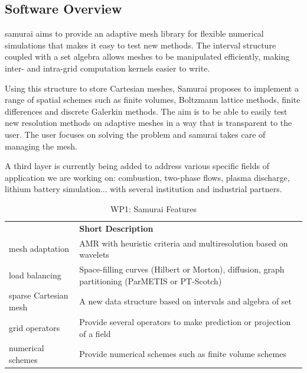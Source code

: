 \subsection{Software Overview}
\label{sec:WP1:Samurai:summary}

samurai aims to provide an adaptive mesh library for flexible numerical simulations that makes it easy to test new methods. The interval structure coupled with a set algebra allows meshes to be manipulated efficiently, making inter- and intra-grid computation kernels easier to write.

Using this structure to store Cartesian meshes, Samurai proposes to implement a range of spatial schemes such as finite volumes, Boltzmann lattice methods, finite differences and discrete Galerkin methods. The aim is to be able to easily test new resolution methods on adaptive meshes in a way that is transparent to the user. The user focuses on solving the problem and samurai takes care of managing the mesh.

A third layer is currently being added to address various specific fields of application we are working on: combustion, two-phase
flows, plasma discharge, lithium battery simulation... with several  institution and industrial partners.

\begin{table}[h!]
    \centering
    {
        \setlength{\parindent}{0pt}
        \def\arraystretch{1.25}
        {
            \fontsize{9}{11}\selectfont
            \begin{tabular}{!{\color{numpexgray}\vrule}p{.25\linewidth}!{\color{numpexgray}\vrule}p{.6885\linewidth}!{\color{numpexgray}\vrule}}

     &  {\rule{0pt}{2.5ex}\color{white}\bf Short Description }\\

        mesh adaptation & AMR with heuristic criteria and multiresolution based on wavelets \\
       load balancing & Space-filling curves (Hilbert or Morton), diffusion, graph partitioning (ParMETIS or PT-Scotch) \\
       sparse Cartesian mesh & A new data structure based on intervals and algebra of set \\
       grid operators & Provide several operators to make prediction or projection of a field \\
      numerical schemes & Provide numerical schemes such as finite volume schemes \\


\end{tabular}
        }
    }
    \caption{WP1: Samurai Features}
    \label{tab:WP1:Samurai:features}
\end{table}


